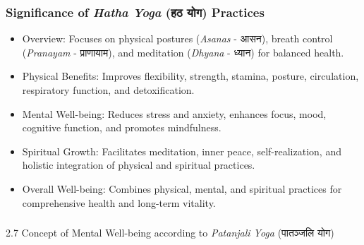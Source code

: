 \begin{frame}[fragile]\frametitle{Significance of \textit{Hatha Yoga} (हठ योग) Practices}

\begin{itemize}
    \item Overview: Focuses on physical postures (\textit{Asanas} - आसन), breath control (\textit{Pranayam} - प्राणायाम), and meditation (\textit{Dhyana} - ध्यान) for balanced health.
    \item Physical Benefits: Improves flexibility, strength, stamina, posture, circulation, respiratory function, and detoxification.
    \item Mental Well-being: Reduces stress and anxiety, enhances focus, mood, cognitive function, and promotes mindfulness.
    \item Spiritual Growth: Facilitates meditation, inner peace, self-realization, and holistic integration of physical and spiritual practices.
    \item Overall Well-being: Combines physical, mental, and spiritual practices for comprehensive health and long-term vitality.
\end{itemize}

\end{frame}

\begin{frame}[fragile]\frametitle{}
\begin{center}
{\Large 2.7  Concept of Mental Well-being according to \textit{Patanjali Yoga} (पातञ्जलि योग)}
\end{center}
\end{frame}



